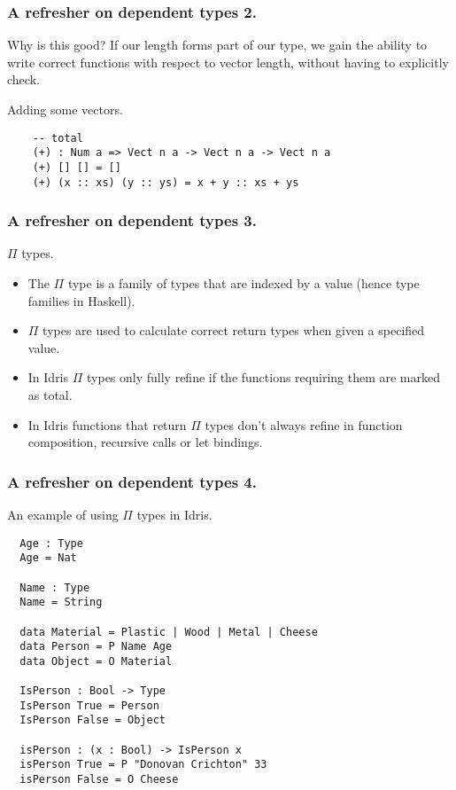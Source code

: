 \documentclass{beamer}
\begin{document}
\begin{frame}[fragile]
  \frametitle{A refresher on dependent types 2.}

  \begin{block}{Why is this good?}
   If our length forms part of our type, we gain the ability
          to write correct functions with respect to vector length,
          without having to explicitly check. 
  \end{block}
  \begin{block}{Adding some vectors.}
  \begin{verbatim}
    -- total
    (+) : Num a => Vect n a -> Vect n a -> Vect n a
    (+) [] [] = []
    (+) (x :: xs) (y :: ys) = x + y :: xs + ys
  \end{verbatim}
  \end{block}
\end{frame}

\begin{frame}[fragile]
  \frametitle{A refresher on dependent types 3.}
  \begin{block}{$\Pi$ types.}
    \begin{itemize}
     \item The $\Pi$ type is a family of types that are indexed by a
           value (hence type families in Haskell).
     \item $\Pi$ types are used to calculate correct return types
             when given a specified value.
     \item In Idris $\Pi$ types only fully refine if the functions
             requiring them are marked as total.
     \item In Idris functions that return $\Pi$ types don't always refine in 
             function composition, recursive calls or let bindings.
     \end{itemize}
  \end{block}
\end{frame}

\begin{frame}[fragile]
  \frametitle{A refresher on dependent types 4.}
  \begin{block}{An example of using $\Pi$ types in Idris.}
  \begin{verbatim}
  Age : Type
  Age = Nat

  Name : Type
  Name = String

  data Material = Plastic | Wood | Metal | Cheese
  data Person = P Name Age
  data Object = O Material

  IsPerson : Bool -> Type
  IsPerson True = Person
  IsPerson False = Object

  isPerson : (x : Bool) -> IsPerson x
  isPerson True = P "Donovan Crichton" 33
  isPerson False = O Cheese
  \end{verbatim}
  \end{block}
\end{frame}
\end{document}
